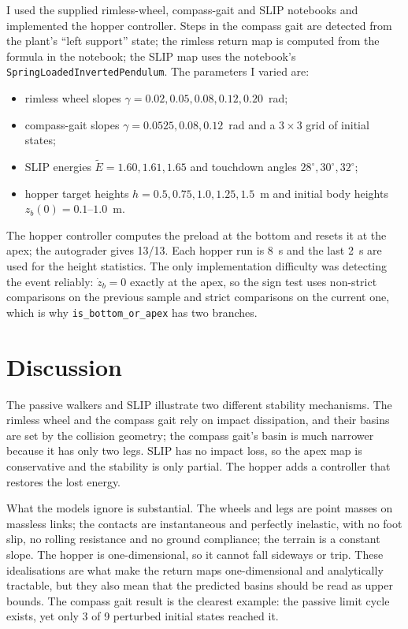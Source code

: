 \documentclass[11pt]{report}
\begin{document}
I used the supplied rimless-wheel, compass-gait and SLIP notebooks and
implemented the hopper controller.  Steps in the compass gait are detected from
the plant's ``left support'' state; the rimless return map is computed from the
formula in the notebook; the SLIP map uses the notebook's
\texttt{SpringLoadedInvertedPendulum}.  The parameters I varied are:
\begin{itemize}[leftmargin=1.4em,itemsep=1pt]
  \item rimless wheel slopes $\gamma=0.02,0.05,0.08,0.12,0.20$~rad;
  \item compass-gait slopes $\gamma=0.0525,0.08,0.12$~rad and a $3\times3$
        grid of initial states;
  \item SLIP energies $\tilde E=1.60,1.61,1.65$ and touchdown angles
        $28^\circ,30^\circ,32^\circ$;
  \item hopper target heights $h=0.5,0.75,1.0,1.25,1.5$~m and initial body
        heights $z_b(0)=0.1$--$1.0$~m.
\end{itemize}
The hopper controller computes the preload at the bottom and resets it at the
apex; the autograder gives 13/13.  Each hopper run is 8~s and the last 2~s are
used for the height statistics.  The only implementation difficulty was
detecting the event reliably: $\dot z_b=0$ exactly at the apex, so the sign test uses
non-strict comparisons on the previous sample and strict comparisons on the
current one, which is why \texttt{is\_bottom\_or\_apex} has two branches.

\section{Discussion}

The passive walkers and SLIP illustrate two different stability mechanisms.
The rimless wheel and the compass gait rely on impact dissipation, and their
basins are set by the collision geometry; the compass gait's basin is much
narrower because it has only two legs.  SLIP has no impact loss, so the apex
map is conservative and the stability is only partial.  The hopper adds a
controller that restores the lost energy.

What the models ignore is substantial.  The wheels and legs are point masses on
massless links; the contacts are instantaneous and perfectly inelastic, with no
foot slip, no rolling resistance and no ground compliance; the terrain is a
constant slope.  The hopper is one-dimensional, so it cannot fall sideways or
trip.  These idealisations are what make the return maps one-dimensional and
analytically tractable, but they also mean that the predicted basins should be
read as upper bounds.  The compass gait result is the clearest example: the
passive limit cycle exists, yet only 3 of 9 perturbed initial states reached it.
\end{document}
